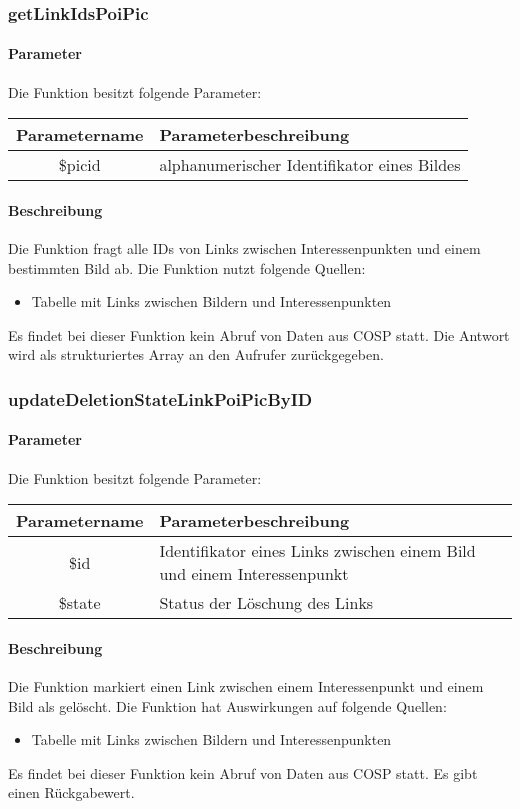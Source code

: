 \subsubsection{getLinkIdsPoiPic}
\paragraph{Parameter} Die Funktion besitzt folgende Parameter:
\begin{table}[H]
	\begin{tabular}{|c|p{11cm}|}
		\hline
		\textbf{Parametername} & \textbf{Parameterbeschreibung} \\ \hline
		\$picid & alphanumerischer Identifikator eines Bildes \\ \hline
	\end{tabular}
\end{table}
\paragraph{Beschreibung} Die Funktion fragt alle IDs von Links zwischen Interessenpunkten und einem bestimmten Bild ab. Die Funktion nutzt folgende Quellen:
\begin{itemize}
	\item Tabelle mit Links zwischen Bildern und Interessenpunkten
\end{itemize}
Es findet bei dieser Funktion kein Abruf von Daten aus {\glqq COSP\grqq} statt. Die Antwort wird als strukturiertes Array an den Aufrufer zurückgegeben.
\subsubsection{updateDeletionStateLinkPoiPicByID}
\paragraph{Parameter} Die Funktion besitzt folgende Parameter:
\begin{table}[H]
	\begin{tabular}{|c|p{11cm}|}
		\hline
		\textbf{Parametername} & \textbf{Parameterbeschreibung} \\ \hline
		\$id    & Identifikator eines Links zwischen einem Bild und einem Interessenpunkt \\ \hline
		\$state & Status der Löschung des Links \\ \hline
	\end{tabular}
\end{table}
\paragraph{Beschreibung} Die Funktion markiert einen Link zwischen einem Interessenpunkt und einem Bild als gelöscht. Die Funktion hat Auswirkungen auf folgende Quellen:
\begin{itemize}
	\item Tabelle mit Links zwischen Bildern und Interessenpunkten
\end{itemize}
Es findet bei dieser Funktion kein Abruf von Daten aus {\glqq COSP\grqq} statt. Es gibt einen Rückgabewert.
